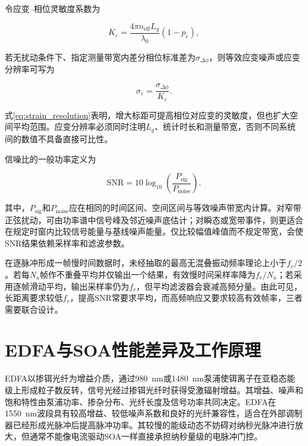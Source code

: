 令应变--相位灵敏度系数为

\begin{equation}
K_\varepsilon
=
\frac{4\pi n_{\mathrm{eff}}L_g}{\lambda_0}(1-p_e),
\label{eq:strain_phase_sensitivity}
\end{equation}

若无扰动条件下、指定测量带宽内差分相位标准差为$\sigma_{\Delta\phi}$，则等效应变噪声或应变分辨率可写为

\begin{equation}
\sigma_\varepsilon
=
\frac{\sigma_{\Delta\phi}}{K_\varepsilon}.
\label{eq:strain_resolution}
\end{equation}

式\eqref{eq:strain_resolution}表明，增大标距可提高相位对应变的灵敏度，但也扩大空间平均范围。应变分辨率必须同时注明$L_g$、统计时长和测量带宽，否则不同系统间的数值不具备直接可比性。

信噪比的一般功率定义为

\begin{equation}
\mathrm{SNR}
=
10\log_{10}\!\left(\frac{P_{\mathrm{sig}}}{P_{\mathrm{noise}}}\right).
\label{eq:das_snr_definition}
\end{equation}

其中，$P_{\mathrm{sig}}$和$P_{\mathrm{noise}}$应在相同的时间区间、空间区间与等效噪声带宽内计算。对窄带正弦扰动，可由功率谱中信号峰及邻近噪声底估计；对瞬态或宽带事件，则更适合在规定时窗内比较信号能量与基线噪声能量。仅比较幅值峰值而不规定带宽，会使SNR结果依赖采样率和滤波参数。

在逐脉冲形成一帧慢时间数据时，未经抽取的最高无混叠振动频率理论上小于$f_r/2$。若每$N_a$帧作不重叠平均并仅输出一个结果，有效慢时间采样率降为$f_r/N_a$；若采用逐帧滑动平均，输出采样率仍为$f_r$，但平均滤波器会衰减高频分量。由此可见，长距离要求较低$f_r$，提高SNR常要求平均，而高频响应又要求较高有效帧率，三者需要联合设计。

\section{EDFA与SOA性能差异及工作原理}
\label{sec:edfa_soa_selection}

EDFA以掺铒光纤为增益介质，通过980~nm或1480~nm泵浦使铒离子在亚稳态能级上形成粒子数反转，信号光经过掺铒光纤时获得受激辐射增益。其增益、噪声和饱和特性由泵浦功率、掺杂分布、光纤长度及信号功率共同决定\cite{giles1991edfa}。EDFA在1550~nm波段具有较高增益、较低噪声系数和良好的光纤兼容性，适合在外部调制器已经形成光脉冲后提高脉冲功率。其较慢的能级动态不妨碍对纳秒光脉冲进行放大，但通常不能像电流驱动SOA一样直接承担纳秒量级的电脉冲门控。

